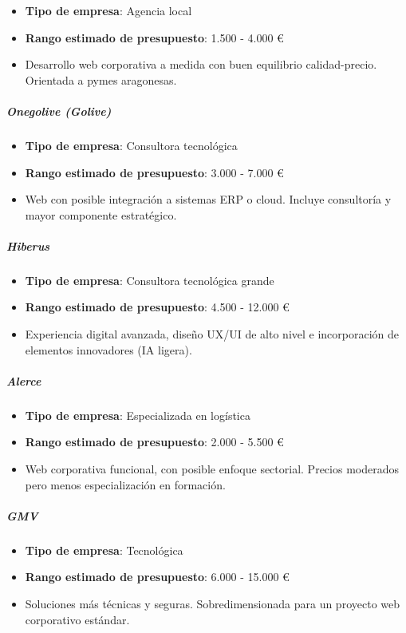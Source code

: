 \documentclass[11.5pt]{article}
\begin{document}
	\begin{itemize}
		\item \textbf{Tipo de empresa}: Agencia local
		\item \textbf{Rango estimado de presupuesto}: 1.500 - 4.000 €
		\item Desarrollo web corporativa a medida con buen equilibrio calidad-precio. Orientada a pymes aragonesas.
	\end{itemize}
	
	\subparagraph*{Onegolive (Golive)}
	
	\begin{itemize}
		\item \textbf{Tipo de empresa}: Consultora tecnológica
		\item \textbf{Rango estimado de presupuesto}: 3.000 - 7.000 €
		\item Web con posible integración a sistemas ERP o cloud. Incluye consultoría y mayor componente estratégico.
	\end{itemize}
	
	\subparagraph*{Hiberus}
	
	\begin{itemize}
		\item \textbf{Tipo de empresa}: Consultora tecnológica grande
		\item \textbf{Rango estimado de presupuesto}: 4.500 - 12.000 €
		\item Experiencia digital avanzada, diseño UX/UI de alto nivel e incorporación de elementos innovadores (IA ligera).
	\end{itemize}
	
	\subparagraph*{Alerce}
	
	\begin{itemize}
		\item \textbf{Tipo de empresa}: Especializada en logística
		\item \textbf{Rango estimado de presupuesto}: 2.000 - 5.500 €
		\item Web corporativa funcional, con posible enfoque sectorial. Precios moderados pero menos especialización en formación.
	\end{itemize}
	
	\subparagraph*{GMV}
	
	\begin{itemize}
		\item \textbf{Tipo de empresa}: Tecnológica
		\item \textbf{Rango estimado de presupuesto}: 6.000 - 15.000 €
		\item Soluciones más técnicas y seguras. Sobredimensionada para un proyecto web corporativo estándar.
	\end{itemize}
	
\end{document}
